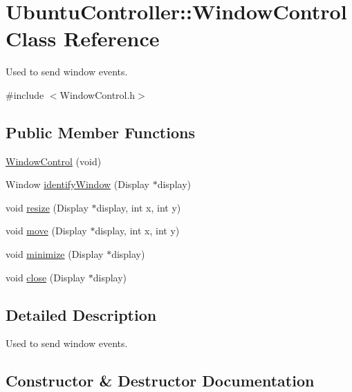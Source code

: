 \hypertarget{classUbuntuController_1_1WindowControl}{}\section{Ubuntu\+Controller\+:\+:Window\+Control Class Reference}
\label{classUbuntuController_1_1WindowControl}


Used to send window events.  




{\ttfamily \#include $<$Window\+Control.\+h$>$}

\subsection*{Public Member Functions}
\begin{DoxyCompactItemize}
\item 
\hyperlink{classUbuntuController_1_1WindowControl_ac1737a56defaa8f60f53054b2167fee8}{Window\+Control} (void)
\item 
Window \hyperlink{classUbuntuController_1_1WindowControl_aad092a22b19664df4d94fe9a853d350a}{identify\+Window} (Display $\ast$display)
\item 
void \hyperlink{classUbuntuController_1_1WindowControl_a131a982c3338be4187ac6611591e042f}{resize} (Display $\ast$display, int x, int y)
\item 
void \hyperlink{classUbuntuController_1_1WindowControl_a367c48d4f217a83225c8ade45e347884}{move} (Display $\ast$display, int x, int y)
\item 
void \hyperlink{classUbuntuController_1_1WindowControl_abb8d0ae3c43be976259181c848fa4568}{minimize} (Display $\ast$display)
\item 
void \hyperlink{classUbuntuController_1_1WindowControl_a2f521062be8be113d1cbcca4f495d693}{close} (Display $\ast$display)
\end{DoxyCompactItemize}


\subsection{Detailed Description}
Used to send window events. 

\subsection{Constructor \& Destructor Documentation}
\mbox{\label{classUbuntuController_1_1WindowControl_ac1737a56defaa8f60f53054b2167fee8}} 
